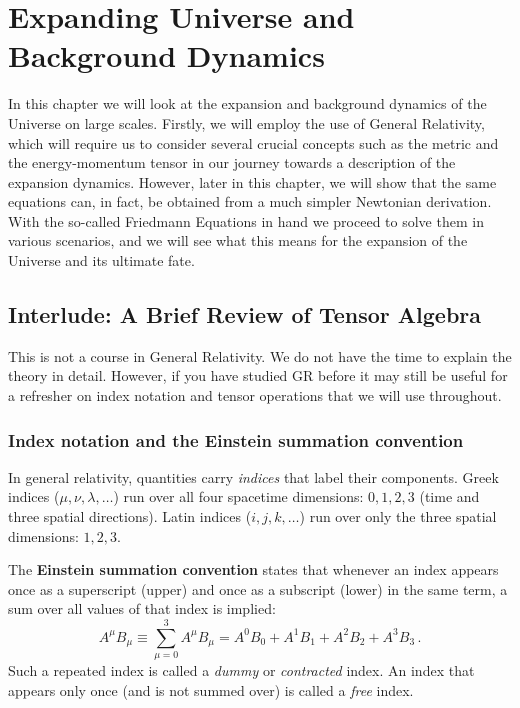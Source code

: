 \chapter{Expanding Universe and Background Dynamics}
\label{ch:background_dynamics}

In this chapter we will look at the expansion and background dynamics of the Universe on large scales. Firstly, we will employ the use of General Relativity, which will require us to consider several crucial concepts such as the metric and the energy-momentum tensor in our journey towards a description of the expansion dynamics. However, later in this chapter, we will show that the same equations can, in fact, be obtained from a much simpler Newtonian derivation. With the so-called Friedmann Equations in hand we proceed to solve them in various scenarios, and we will see what this means for the expansion of the Universe and its ultimate fate. 


\section*{Interlude: A Brief Review of Tensor Algebra}

This is not a course in General Relativity. We do not have the time to explain the theory in detail. However, if you have studied GR before it may still be useful for a refresher on index notation and tensor operations that we will use throughout.

\subsection*{Index notation and the Einstein summation convention}

In general relativity, quantities carry \emph{indices} that label their components. Greek indices ($\mu, \nu, \lambda, \ldots$) run over all four spacetime dimensions: $0,1,2,3$ (time and three spatial directions). Latin indices ($i, j, k, \ldots$) run over only the three spatial dimensions: $1,2,3$.

The \textbf{Einstein summation convention} states that whenever an index appears once as a superscript (upper) and once as a subscript (lower) in the same term, a sum over all values of that index is implied:
\begin{equation}
    A^\mu B_\mu \equiv \sum_{\mu=0}^{3} A^\mu B_\mu = A^0 B_0 + A^1 B_1 + A^2 B_2 + A^3 B_3\,.
\end{equation}
Such a repeated index is called a \emph{dummy} or \emph{contracted} index. An index that appears only once (and is not summed over) is called a \emph{free} index.

